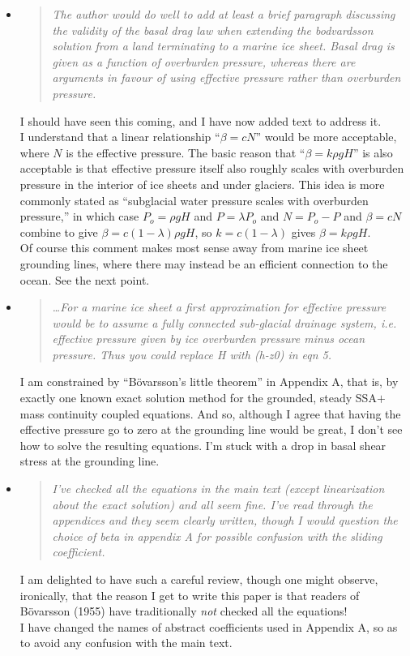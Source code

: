 \documentclass[11pt,reqno]{amsart}
\renewcommand{\dh}{\fontencoding{T1}\selectfont{\symbol{240}}}
\newcommand{\bod}{B\"o\dh varsson\xspace}
\newcommand{\citebod}{B\"o\dh varsson (1955)\nocite{Bodvardsson}\xspace}
\newcommand{\reply}[2]{
\medskip\medskip
\item  \begin{quote}
\emph{#1}
\end{quote}

\medskip
\noindent #2}
\begin{document}
\begin{itemize}
\reply{The author would do well to add at least a brief paragraph discussing the validity of the basal drag law when extending the bodvardsson solution from a land terminating to a marine ice sheet.  Basal drag is given as a function of overburden pressure, whereas there are arguments in favour of using effective pressure rather than overburden pressure.}
{I should have seen this coming, and I have now added text to address it. \medskip \\
I understand that a linear relationship ``$\beta = c N$'' would be more acceptable, where $N$ is the effective pressure.  The basic reason that ``$\beta = k \rho g H$'' is also acceptable is that effective pressure itself also roughly scales with overburden pressure in the interior of ice sheets and under glaciers.  This idea is more commonly stated as ``subglacial water pressure scales with overburden pressure,'' in which case $P_o = \rho g H$ and $P=\lambda P_o$ and $N=P_o - P$ and $\beta = c N$ combine to give $\beta = c (1 - \lambda) \rho g H$, so $k=c(1-\lambda)$ gives $\beta = k \rho g H$.
\medskip \\
Of course this comment makes most sense away from marine ice sheet grounding lines, where there may instead be an efficient connection to the ocean.  See the next point.}

\reply{\dots For a marine ice sheet a first approximation for effective pressure would be to assume a fully connected sub-glacial drainage system, i.e. effective pressure given by ice overburden pressure minus ocean pressure. Thus you could replace H with (h-z0) in eqn 5.}
{I am constrained by ``\bod's little theorem'' in Appendix A, that is, by exactly one known exact solution method for the grounded, steady SSA$+$mass continuity coupled equations.  And so, although I agree that having the effective pressure go to zero at the grounding line would be great, I don't see how to solve the resulting equations.  I'm stuck with a drop in basal shear stress at the grounding line.}

\reply{I've checked all the equations in the main text (except linearization about the exact solution) and all seem fine. I've read through the appendices and they seem clearly written, though I would question the choice of beta in appendix A for possible confusion with the sliding coefficient.}
{I am delighted to have such a careful review, though one might observe, ironically, that the reason I get to write this paper is that readers of \citebod have traditionally \emph{not} checked all the equations! \medskip \\
I have changed the names of abstract coefficients used in Appendix A, so as to avoid any confusion with the main text.}


\end{itemize}
\end{document}
